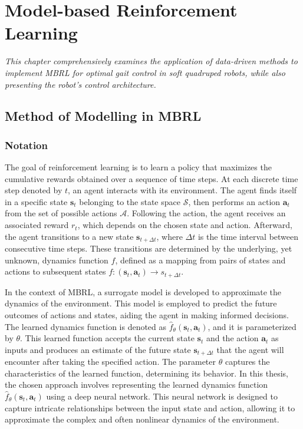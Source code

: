 \chapter{Model-based Reinforcement Learning}
\label{chap4}
\textit{This chapter comprehensively examines the application of data-driven methods to implement \ac{MBRL} for optimal gait control in soft quadruped robots, while also presenting the robot's control architecture.}

\section{Method of Modelling in MBRL}
\subsection{Notation}
The goal of reinforcement learning is to learn a policy that maximizes the cumulative rewards obtained over a sequence of time steps. At each discrete time step denoted by $t$, an agent interacts with its environment. The agent finds itself in a specific state $\mathbf{s}_t$ belonging to the state space $\mathcal{S}$, then performs an action $\mathbf{a}_t$ from the set of possible actions $\mathcal{A}$. Following the action, the agent receives an associated reward $r_t$, which depends on the chosen state and action. Afterward, the agent transitions to a new state $\mathbf{s}_{t+\Delta t}$, where $\Delta t$ is the time interval between consecutive time steps. These transitions are determined by the underlying, yet unknown, dynamics function $f$, defined as a mapping from pairs of states and actions to subsequent states $f: (\mathbf{s}_t, \mathbf{a}_t) \rightarrow s_{t+\Delta t}$. 

In the context of \ac{MBRL}, a surrogate model is developed to approximate the dynamics of the environment. This model is employed to predict the future outcomes of actions and states, aiding the agent in making informed decisions. The learned dynamics function is denoted as $\hat{f}_\theta(\mathbf{s}_t, \mathbf{a}_t)$, and it is parameterized by $\theta$. This learned function accepts the current state $\mathbf{s}_t$ and the action $\mathbf{a}_t$ as inputs and produces an estimate of the future state $\mathbf{s}_{t+\Delta t}$ that the agent will encounter after taking the specified action. The parameter $\theta$ captures the characteristics of the learned function, determining its behavior. In this thesis, the chosen approach involves representing the learned dynamics function $\hat{f}_\theta(\mathbf{s}_t, \mathbf{a}_t)$ using a deep neural network. This neural network is designed to capture intricate relationships between the input state and action, allowing it to approximate the complex and often nonlinear dynamics of the environment. 

